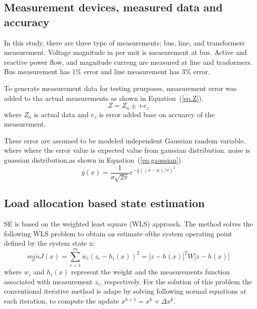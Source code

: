   \subsection{Measurement devices, measured data and accuracy}
    In this study, there are three type of measurements; bus, line, and transformers measurement.
    Voltage magnitude in per unit is measurement at bus. Active and reactive power flow, and magnitude curreng are measured at line and trasformers.
    Bus measurement has 1$\%$ error and line measurement has 3$\%$ error.

    To generate measurement data for testing prurposes, measurement error was added to tha actual measurements as shown in Equation~(\ref{eq.Z}).
    \begin{equation}
      Z=Z_{a} \pm +e_{z}
    \label{eq.Z}
    \end{equation}
    where $Z_{a}$ is actual data and $e_{z}$ is error added base on accuarcy of the measurement.

    These error are assumed to be modeled independent Gaussian random variable\cite{b2}.
    where where the error value is expected value from gaussian distribution.
    noise is guassian distribution,as shown in Equation~(\ref{eq.gaussian}).
    \begin{equation}
      g(x)=\frac{1}{\sigma \sqrt{2\pi}}e^{-\frac{1}{2}((x-\mu)/\sigma)^2}
    \label{eq.gaussian}
    \end{equation}

  \subsection{Load allocation based state estimation}

    SE is based on the weighted least square (WLS) approach\cite{b1}.
    The method solves the following WLS problem to obtain an estimate ofthe system operating point defined by the system state x:
    \begin{equation}
      \underset{x}{min} J(x)=\sum_{i=1}^{m}w_{i}(z_{i}-h_{i}(x))^{2}=\big[ z-h(x)\big]^{T}W\big[z-h(x)\big]
    \label{eq.jacobian}
    \end{equation}
    where $w_{i}$ and $h_{i}(x)$ represent the weight and the measurements function associated with measurement $z_{i}$, respectively.
    For the solution of this problem the conventional iterative method is adape by solving following normal equations at each iteration, to compute the update $x^{k+1}=x^{k}+\Delta x^{k}$.

